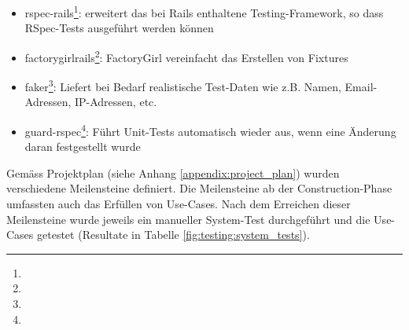 \begin{itemize}
\item rspec-rails\footnote{}: erweitert das bei Rails enthaltene Testing-Framework, so dass RSpec-Tests ausgeführt werden können
\item factory\textunderscore girl\textunderscore rails\footnote{}: FactoryGirl vereinfacht das Erstellen von Fixtures
\item faker\footnote{}: Liefert bei Bedarf realistische Test-Daten wie z.B. Namen, Email-Adressen, IP-Adressen, etc.
\item guard-rspec\footnote{}: Führt Unit-Tests automatisch wieder aus, wenn eine Änderung daran festgestellt wurde
\end{itemize}

Gemäss Projektplan (siehe Anhang \ref{appendix:project_plan}) wurden verschiedene Meilensteine definiert. Die Meilensteine ab der Construction-Phase umfassten auch das Erfüllen von Use-Cases. Nach dem Erreichen dieser Meilensteine wurde jeweils ein manueller System-Test durchgeführt und die Use-Cases getestet (Resultate in Tabelle \ref{fig:testing:system_tests}).

